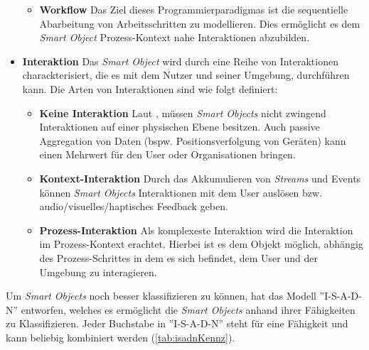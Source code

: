 \begin{itemize}
\begin{itemize}
        \item \textbf{Workflow} Das Ziel dieses Programmierparadigmas ist die sequentielle Abarbeitung von Arbeitsschritten zu modellieren. Dies ermöglicht es dem \textit{Smart Object} Prozess-Kontext nahe Interaktionen abzubilden.
    \end{itemize}
    \item \textbf{Interaktion} Das \textit{Smart Object} wird durch eine Reihe von Interaktionen charackterisiert, die es mit dem Nutzer und seiner Umgebung, durchführen kann. Die Arten von Interaktionen sind wie folgt definiert:
    \begin{itemize}
        \item \textbf{Keine Interaktion} Laut \cite{mattern2010internet}, müssen \textit{Smart Objects} nicht zwingend Interaktionen auf einer physischen Ebene besitzen. Auch passive Aggregation von Daten (bspw. Positionsverfolgung von Geräten) kann einen Mehrwert für den User oder Organisationen bringen.
        \item \textbf{Kontext-Interaktion} Durch das Akkumulieren von \textit{Streams} und Events können \textit{Smart Objects} Interaktionen mit dem User auslösen bzw. audio/visuelles/haptisches Feedback geben. 
        \item \textbf{Prozess-Interaktion} Als komplexeste Interaktion wird die Interaktion im Prozess-Kontext erachtet. Hierbei ist es dem Objekt möglich, abhängig des Prozess-Schrittes in dem es sich befindet, dem User und der Umgebung zu interagieren.
    \end{itemize}
\end{itemize}
Um \textit{Smart Objects} noch besser klassifizieren zu können, hat \cite{lopez2011taxonomy} das Modell ''I-S-A-D-N'' entworfen, welches es ermöglicht die \textit{Smart Objects} anhand ihrer Fähigkeiten zu Klassifizieren. Jeder Buchstabe in ''I-S-A-D-N'' steht für eine Fähigkeit und kann beliebig kombiniert werden (\ref{tab:isadnKennz}). 
